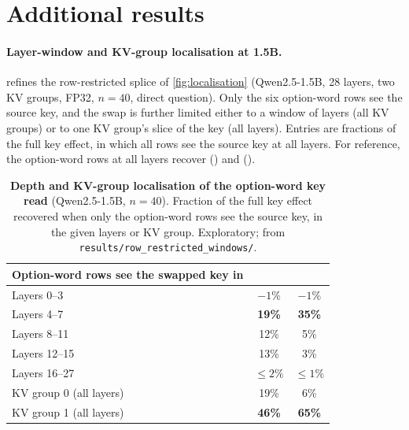\section{Additional results}\label{app:additional}

\paragraph{Layer-window and KV-group localisation at 1.5B.}  refines the row-restricted splice of \cref{fig:localisation} (Qwen2.5-1.5B, 28 layers, two KV groups, FP32, $n = 40$, direct question). Only the six option-word rows see the source key, and the swap is further limited either to a window of layers (all KV groups) or to one KV group's slice of the key (all layers). Entries are fractions of the full key effect, in which all rows see the source key at all layers. For reference, the option-word rows at all layers recover \locOptChoicewords{} (\fmtOpt{}) and \locLetterChoicewords{} (\fmtLetter{}).

\begin{table}[h]
\centering
\small
\caption{\textbf{Depth and KV-group localisation of the option-word key read} (Qwen2.5-1.5B, $n = 40$). Fraction of the full key effect recovered when only the option-word rows see the source key, in the given layers or KV group. Exploratory; from \texttt{results/row\_restricted\_windows/}.}
\label{tab:windows}
\begin{tabular}{lcc}
\toprule
Option-word rows see the swapped key in & \fmtOpt{} & \fmtLetter{} \\
\midrule
Layers 0--3 & $-1\%$ & $-1\%$ \\
Layers 4--7 & \textbf{19\%} & \textbf{35\%} \\
Layers 8--11 & 12\% & 5\% \\
Layers 12--15 & 13\% & 3\% \\
Layers 16--27 & $\leq 2\%$ & $\leq 1\%$ \\
\midrule
KV group 0 (all layers) & 19\% & 6\% \\
KV group 1 (all layers) & \textbf{46\%} & \textbf{65\%} \\
\bottomrule
\end{tabular}
\end{table}

